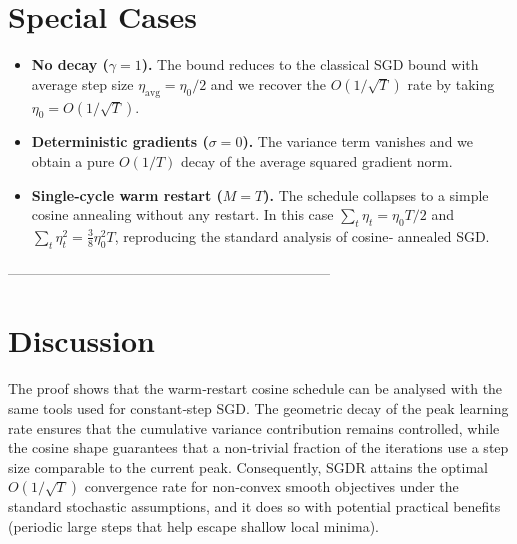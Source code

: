 \documentclass{article}
\begin{document}
\section*{Special Cases}
\begin{itemize}
\item \textbf{No decay ($\gamma=1$).}
    The bound reduces to the classical SGD bound with average step size
    $\eta_{\text{avg}}=\eta_0/2$ and we recover the $O(1/\sqrt{T})$ rate
    by taking $\eta_0=O(1/\sqrt{T})$.
\item \textbf{Deterministic gradients ($\sigma=0$).}
    The variance term vanishes and we obtain a pure $O(1/T)$ decay of the
    average squared gradient norm.
\item \textbf{Single‑cycle warm restart ($M=T$).}
    The schedule collapses to a simple cosine annealing without any restart.
    In this case $\sum_{t}\eta_t = \eta_0 T/2$ and $\sum_{t}\eta_t^{2}
    = \frac{3}{8}\eta_0^{2}T$, reproducing the standard analysis of cosine‑
    annealed SGD.
\end{itemize}

---------------------------------------------------------------------

\section*{Discussion}
The proof shows that the warm‑restart cosine schedule can be analysed with
the same tools used for constant‑step SGD.  The geometric decay of the peak
learning rate ensures that the cumulative variance contribution remains
controlled, while the cosine shape guarantees that a non‑trivial fraction of
the iterations use a step size comparable to the current peak.  Consequently,
SGDR attains the optimal $O(1/\sqrt{T})$ convergence rate for non‑convex smooth
objectives under the standard stochastic assumptions, and it does so with
potential practical benefits (periodic large steps that help escape shallow
local minima).  
\end{document}
